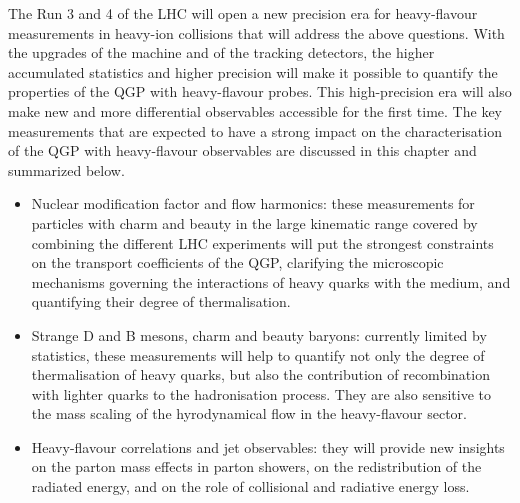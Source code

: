 The Run 3 and 4 of the LHC will open a new precision era for heavy-flavour measurements in heavy-ion collisions that will address the above questions. 
With the upgrades of the machine and of the tracking detectors, the higher accumulated statistics and higher precision will make it possible to quantify the properties of the QGP with heavy-flavour probes. This high-precision era will also make new and more differential observables accessible for the first time.
The key measurements that are expected to have a strong impact on the characterisation of the QGP with heavy-flavour observables are discussed in this chapter and summarized below.
\begin{itemize}
\item Nuclear modification factor and flow harmonics: these measurements for particles with charm and beauty in the large kinematic range covered by combining the different LHC experiments will put the strongest constraints on the transport coefficients of the QGP, clarifying the microscopic mechanisms governing the interactions of heavy quarks with the medium, and quantifying their degree of thermalisation.
\item Strange D and B mesons, charm and beauty baryons: currently limited by statistics, these measurements will help to quantify not only the degree of thermalisation of heavy quarks, but also the contribution of recombination with lighter quarks to the hadronisation process. They are also sensitive to the mass scaling of the hyrodynamical flow in the heavy-flavour sector.
\item Heavy-flavour correlations and jet observables: they will provide new insights on the parton mass effects in parton showers, on the redistribution of the radiated energy, and on the role of collisional and radiative energy loss.

\end{itemize}


